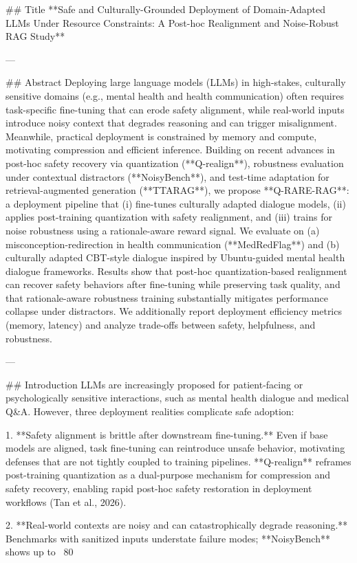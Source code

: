 ## Title  
**Safe and Culturally-Grounded Deployment of Domain-Adapted LLMs Under Resource Constraints: A Post-hoc Realignment and Noise-Robust RAG Study**

---

## Abstract  
Deploying large language models (LLMs) in high-stakes, culturally sensitive domains (e.g., mental health and health communication) often requires task-specific fine-tuning that can erode safety alignment, while real-world inputs introduce noisy context that degrades reasoning and can trigger misalignment. Meanwhile, practical deployment is constrained by memory and compute, motivating compression and efficient inference. Building on recent advances in post-hoc safety recovery via quantization (**Q-realign**), robustness evaluation under contextual distractors (**NoisyBench**), and test-time adaptation for retrieval-augmented generation (**TTARAG**), we propose **Q-RARE-RAG**: a deployment pipeline that (i) fine-tunes culturally adapted dialogue models, (ii) applies post-training quantization with safety realignment, and (iii) trains for noise robustness using a rationale-aware reward signal. We evaluate on (a) misconception-redirection in health communication (**MedRedFlag**) and (b) culturally adapted CBT-style dialogue inspired by Ubuntu-guided mental health dialogue frameworks. Results show that post-hoc quantization-based realignment can recover safety behaviors after fine-tuning while preserving task quality, and that rationale-aware robustness training substantially mitigates performance collapse under distractors. We additionally report deployment efficiency metrics (memory, latency) and analyze trade-offs between safety, helpfulness, and robustness.

---

## Introduction  
LLMs are increasingly proposed for patient-facing or psychologically sensitive interactions, such as mental health dialogue and medical Q&A. However, three deployment realities complicate safe adoption:

1. **Safety alignment is brittle after downstream fine-tuning.** Even if base models are aligned, task fine-tuning can reintroduce unsafe behavior, motivating defenses that are not tightly coupled to training pipelines. **Q-realign** reframes post-training quantization as a dual-purpose mechanism for compression and safety recovery, enabling rapid post-hoc safety restoration in deployment workflows (Tan et al., 2026).

2. **Real-world contexts are noisy and can catastrophically degrade reasoning.** Benchmarks with sanitized inputs understate failure modes; **NoisyBench** shows up to ~80%

